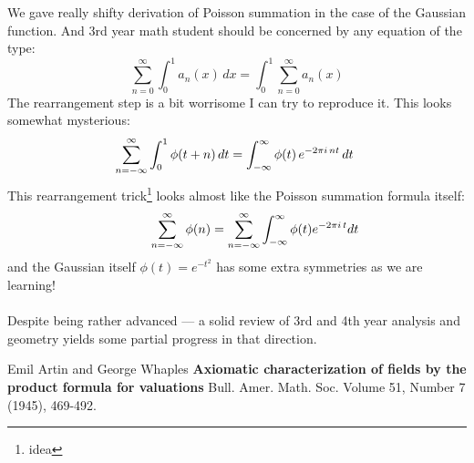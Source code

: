 \documentclass[12pt]{article}
\begin{document}
\newpage

\noindent We gave really shifty derivation of Poisson summation in the case of the Gaussian function.  And 3rd year math student should be concerned by any equation of the type:
$$ \sum_{n=0}^\infty \int_0^1 a_n(x) \, dx = 
\int_0^1 \sum_{n=0}^\infty a_n(x) $$
The rearrangement step is a bit worrisome I can try to reproduce it.  This looks somewhat mysterious:
$$\hspace{-0.05in} \sum_{n=-\infty}^\infty \int_0^1 \phi(t + n ) \, dt = \int_{-\infty}^\infty \phi(t) \, e^{-2\pi i\, nt} \, dt $$
This rearrangement trick\footnote{idea} looks almost like the Poisson summation formula itself:
$$ \hspace{0.4in}\sum_{n = - \infty}^\infty \phi(n) = \sum_{n = - \infty}^\infty \int_{-\infty}^\infty \phi(t) e^{- 2\pi i\, t} dt $$
and the Gaussian itself $\phi(t) = e^{-t^2}$ has some extra symmetries as we are learning!  \\ \\
Despite being rather advanced --- a solid review of 3rd and 4th year analysis and geometry yields some partial progress in that direction.




\begin{thebibliography}{}

\item Emil Artin and George Whaples \textbf{Axiomatic characterization of fields by the product formula for valuations} Bull. Amer. Math. Soc.
Volume 51, Number 7 (1945), 469-492.




\end{thebibliography}
\end{document}
